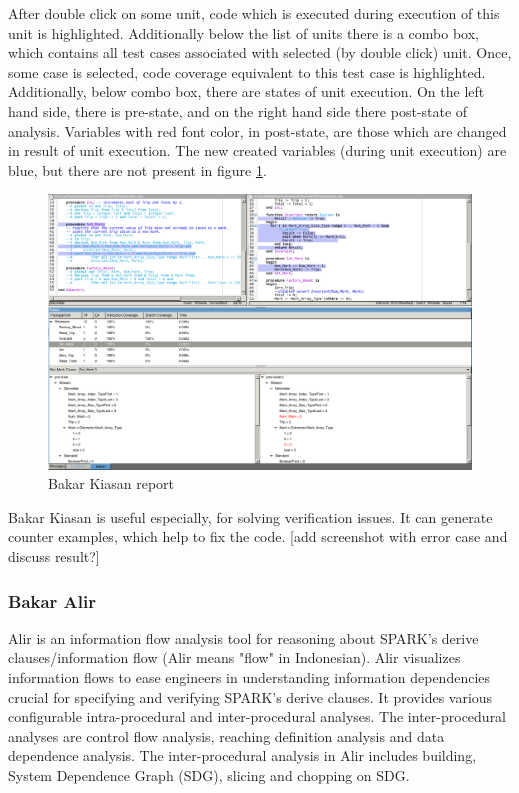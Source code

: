After double click on some unit, code which is executed during execution of this unit is highlighted. Additionally below the list of units there is a combo box, which contains all test cases associated with selected (by double click) unit. Once, some case is selected, code coverage equivalent to this test case is highlighted. Additionally, below combo box, there are states of unit execution. On the left hand side, there is pre-state, and on the right hand side there post-state of analysis. Variables with red font color, in post-state, are those which are changed in result of unit execution. The new created variables (during unit execution) are blue, but there are not present in figure \ref{figure:kiasan-sample}.

\begin{figure}[ht]%
    \begin{center}
    	\includegraphics[width=1\textwidth]{figures/kiasan-sample.png}    	
    \end{center}
    \caption{Bakar Kiasan report}
    \label{figure:kiasan-sample}
\end{figure}

Bakar Kiasan is useful especially, for solving verification issues. It can generate counter examples, which help to fix the code.
[add screenshot with error case and discuss result?]


\subsubsection{Bakar Alir}
Alir is an information flow analysis tool for reasoning about SPARK's derive clauses/information flow (Alir means "flow" in Indonesian). Alir visualizes information flows to ease engineers in understanding information dependencies crucial for specifying and verifying SPARK's derive clauses. It provides various configurable intra-procedural and inter-procedural analyses. The inter-procedural analyses are control flow analysis, reaching definition analysis and data dependence analysis. The inter-procedural analysis in Alir includes building, System Dependence Graph (SDG), slicing and chopping on SDG. \cite{Hari:Thesis}


